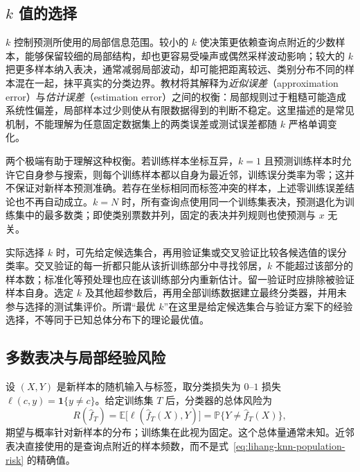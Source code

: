 \subsection{$k$ 值的选择}
\label{subsec:lihang-knn-k}

$k$ 控制预测所使用的局部信息范围。较小的 $k$ 使决策更依赖查询点附近的少数样本，能够保留较细的局部结构，却也更容易受噪声或偶然采样波动影响；较大的 $k$ 把更多样本纳入表决，通常减弱局部波动，却可能把距离较远、类别分布不同的样本混在一起，抹平真实的分类边界。教材将其解释为\emph{近似误差}（approximation error）与\emph{估计误差}（estimation error）之间的权衡：局部规则过于粗糙可能造成系统性偏差，局部样本过少则使从有限数据得到的判断不稳定。这里描述的是常见机制，不能理解为任意固定数据集上的两类误差或测试误差都随 $k$ 严格单调变化。

两个极端有助于理解这种权衡。若训练样本坐标互异，$k=1$ 且预测训练样本时允许它自身参与搜索，则每个训练样本都以自身为最近邻，训练误分类率为零；这并不保证对新样本预测准确。若存在坐标相同而标签冲突的样本，上述零训练误差结论也不再自动成立。$k=N$ 时，所有查询点使用同一个训练集表决，预测退化为训练集中的最多数类；即使类别票数并列，固定的表决并列规则也使预测与 $x$ 无关。

实际选择 $k$ 时，可先给定候选集合，再用验证集或交叉验证比较各候选值的误分类率。交叉验证的每一折都只能从该折训练部分中寻找邻居，$k$ 不能超过该部分的样本数；标准化等预处理也应在该训练部分内重新估计。留一验证时应排除被验证样本自身。选定 $k$ 及其他超参数后，再用全部训练数据建立最终分类器，并用未参与选择的测试集评价。所谓“最优 $k$”在这里是给定候选集合与验证方案下的经验选择，不等同于已知总体分布下的理论最优值。

\subsection{多数表决与局部经验风险}
\label{subsec:lihang-knn-decision}

设 $(X,Y)$ 是新样本的随机输入与标签，取分类损失为 $0$--$1$ 损失 $\ell(c,y)=\mathbf 1\{y\ne c\}$。给定训练集 $T$ 后，分类器的总体风险为
\begin{equation}
  R(\widehat f_T)
  =\mathbb E\bigl[\ell(\widehat f_T(X),Y)\bigr]
  =\mathbb P\{Y\ne\widehat f_T(X)\},
  \label{eq:lihang-knn-population-risk}
\end{equation}
期望与概率针对新样本的分布；训练集在此视为固定。这个总体量通常未知。近邻表决直接使用的是查询点附近的样本频数，而不是式~\eqref{eq:lihang-knn-population-risk} 的精确值。

